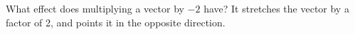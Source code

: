 {What effect does multiplying a vector by $-2$ have?
}
{It stretches the vector by a factor of 2, and points it in the opposite direction.
}
